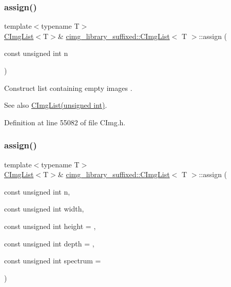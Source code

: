 \subsubsection{\texorpdfstring{assign()}{assign()}\hspace{0.1cm}{\footnotesize\ttfamily [2/18]}}
{\footnotesize\ttfamily template$<$typename T$>$ \\
\hyperlink{structcimg__library__suffixed_1_1CImgList}{C\+Img\+List}$<$T$>$\& \hyperlink{structcimg__library__suffixed_1_1CImgList}{cimg\+\_\+library\+\_\+suffixed\+::\+C\+Img\+List}$<$ T $>$\+::assign (\begin{DoxyParamCaption}\item[{const unsigned int}]{n }\end{DoxyParamCaption})\hspace{0.3cm}{\ttfamily [inline]}}



Construct list containing empty images . 

\begin{DoxySeeAlso}{See also}
\hyperlink{structcimg__library__suffixed_1_1CImgList_abf01d78f440ac4203e4d4055ac7b810b}{C\+Img\+List(unsigned int)}. 
\end{DoxySeeAlso}


Definition at line 55082 of file C\+Img.\+h.

\mbox{\label{structcimg__library__suffixed_1_1CImgList_a84339e54f3d53a5e07e3ceb38bb3d07e}} 
\subsubsection{\texorpdfstring{assign()}{assign()}\hspace{0.1cm}{\footnotesize\ttfamily [3/18]}}
{\footnotesize\ttfamily template$<$typename T$>$ \\
\hyperlink{structcimg__library__suffixed_1_1CImgList}{C\+Img\+List}$<$T$>$\& \hyperlink{structcimg__library__suffixed_1_1CImgList}{cimg\+\_\+library\+\_\+suffixed\+::\+C\+Img\+List}$<$ T $>$\+::assign (\begin{DoxyParamCaption}\item[{const unsigned int}]{n,  }\item[{const unsigned int}]{width,  }\item[{const unsigned int}]{height = {},  }\item[{const unsigned int}]{depth = {},  }\item[{const unsigned int}]{spectrum = {} }\end{DoxyParamCaption})\hspace{0.3cm}{\ttfamily [inline]}}



